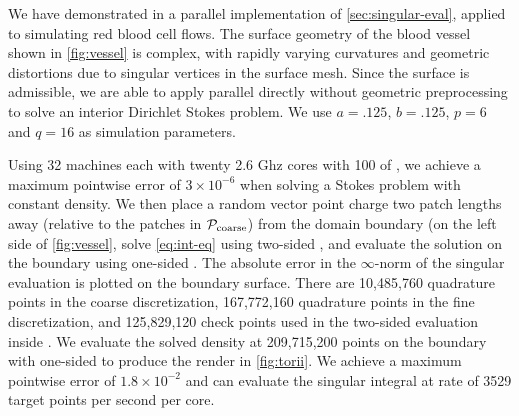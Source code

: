 We have demonstrated in \cite{lu2019scalable} a parallel implementation of \cref{sec:singular-eval}, applied to simulating red blood cell flows.
The surface geometry of the blood vessel shown in \cref{fig:vessel} is complex, with rapidly varying curvatures and geometric distortions due to singular vertices in the surface mesh.
Since the surface is admissible, we are able to apply parallel \qbkix directly without geometric preprocessing to solve an interior Dirichlet Stokes problem.
We use $a=.125$, $b=.125$, $p=6$ and $q=16$ as simulation parameters.

Using 32 machines each with twenty 2.6 Ghz cores with 100 of , we achieve a maximum pointwise error of $3\times 10^{-6}$ when solving a Stokes problem with constant density. 
We then place a random vector point charge two patch lengths away (relative to the patches in ${\mathcal{P}_{\mathrm{coarse}}}$) from the domain boundary (on the left side of \cref{fig:vessel}, solve \cref{eq:int-eq} using two-sided \qbkix, and evaluate the solution on the boundary using one-sided \qbkix.
The absolute error in the $\infty$-norm of the singular evaluation is plotted on the boundary surface.
There are 10,485,760 quadrature points in the coarse discretization, 167,772,160 quadrature points in the fine discretization, and 125,829,120 check points used in the two-sided \qbkix evaluation inside \gmres.
We evaluate the solved density at 209,715,200 points on the boundary with one-sided \qbkix to produce the render in \cref{fig:torii}.
We achieve a maximum pointwise error of $1.8\times 10^{-2}$ and can evaluate the singular integral at rate of 3529 target points per second per core. 
\fi
